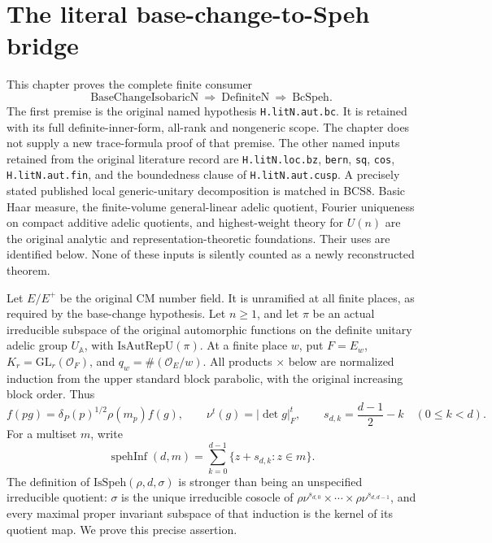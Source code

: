\documentclass[11pt,a4paper]{article}
\numberwithin{equation}{section}
\theoremstyle{remark}\newtheorem{remark}[theorem]{Remark}
\begin{document}
\section{The literal base-change-to-Speh bridge}
\label{sec:base-change-v44}

This chapter proves the complete finite consumer
\[
 \mathrm{BaseChangeIsobaricN}\ \Longrightarrow\
 \mathrm{DefiniteN}\ \Longrightarrow\ \mathrm{BcSpeh}.
 \tag{BCS.1}
\]
The first premise is the original named hypothesis
\texttt{H.\allowbreak lit\allowbreak N.\allowbreak aut.\allowbreak bc}.  It is retained with its full definite-inner-form,
all-rank and nongeneric scope.  The chapter does not supply a new
trace-formula proof of that premise.  The other named inputs retained
from the original literature record are
\texttt{H.\allowbreak lit\allowbreak N.\allowbreak loc.\allowbreak bz}, \texttt{bern}, \texttt{sq}, \texttt{cos},
\texttt{H.\allowbreak lit\allowbreak N.\allowbreak aut.\allowbreak fin}, and the boundedness clause of
\texttt{H.\allowbreak lit\allowbreak N.\allowbreak aut.\allowbreak cusp}.  A precisely stated published local
generic-unitary decomposition is matched in BCS8.  Basic Haar measure,
the finite-volume general-linear adelic quotient, Fourier uniqueness on
compact additive adelic quotients, and highest-weight theory for
\(U(n)\) are the original analytic and representation-theoretic
foundations.  Their uses are identified below.  None of these inputs
is silently counted as a newly reconstructed theorem.

Let \(E/E^+\) be the original CM number field.  It is unramified at
all finite places, as required by the base-change hypothesis.
Let \(n\ge1\), and
let \(\pi\) be an actual irreducible subspace of the original
automorphic functions on the definite unitary adelic group
\(U_{\mathbb A}\), with \(\mathrm{IsAutRepU}(\pi)\).
At a finite place \(w\), put \(F=E_w\),
\(K_r=\mathrm{GL}_r(\mathcal O_F)\), and
\(q_w=\#(\mathcal O_E/w)\).  All products \(\times\) below are
normalized induction from the upper standard block parabolic, with
the original increasing block order.  Thus
\[
 f(pg)=\delta_P(p)^{1/2}\rho(m_p)f(g),\qquad
 \nu^t(g)=|\det g|_F^t,\qquad
 s_{d,k}=\frac{d-1}{2}-k\quad(0\le k<d).
 \tag{BCS.2}
\]
For a multiset \(m\), write
\[
 \operatorname{spehInf}(d,m)
   =\sum_{k=0}^{d-1}\{z+s_{d,k}:z\in m\}.
 \tag{BCS.3}
\]
The definition of \(\mathrm{IsSpeh}(\rho,d,\sigma)\) is stronger
than being an unspecified irreducible quotient: \(\sigma\) is the
unique irreducible cosocle of
\(\rho\nu^{s_{d,0}}\times\cdots\times\rho\nu^{s_{d,d-1}}\),
and every maximal proper invariant subspace of that induction is the
kernel of its quotient map.  We prove this precise assertion.
\end{document}
